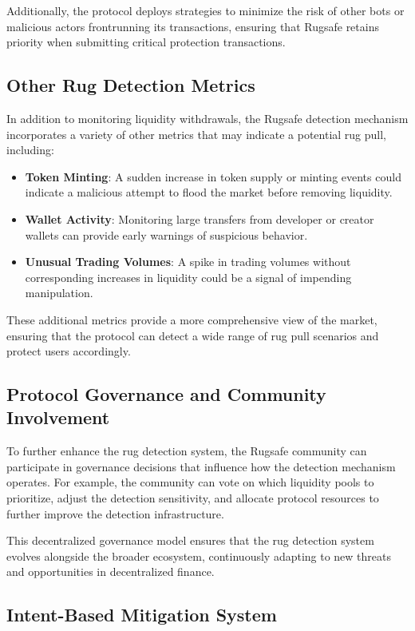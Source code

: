 \documentclass{article}
\begin{document}
Additionally, the protocol deploys strategies to minimize the risk of other bots or malicious actors frontrunning its transactions, ensuring that Rugsafe retains priority when submitting critical protection transactions.

\subsection{Other Rug Detection Metrics}

In addition to monitoring liquidity withdrawals, the Rugsafe detection mechanism incorporates a variety of other metrics that may indicate a potential rug pull, including:

\begin{itemize}
    \item \textbf{Token Minting}: A sudden increase in token supply or minting events could indicate a malicious attempt to flood the market before removing liquidity.
    \item \textbf{Wallet Activity}: Monitoring large transfers from developer or creator wallets can provide early warnings of suspicious behavior.
    \item \textbf{Unusual Trading Volumes}: A spike in trading volumes without corresponding increases in liquidity could be a signal of impending manipulation.
\end{itemize}

These additional metrics provide a more comprehensive view of the market, ensuring that the protocol can detect a wide range of rug pull scenarios and protect users accordingly.

\subsection{Protocol Governance and Community Involvement}

To further enhance the rug detection system, the Rugsafe community can participate in governance decisions that influence how the detection mechanism operates. For example, the community can vote on which liquidity pools to prioritize, adjust the detection sensitivity, and allocate protocol resources to further improve the detection infrastructure.

This decentralized governance model ensures that the rug detection system evolves alongside the broader ecosystem, continuously adapting to new threats and opportunities in decentralized finance.

\subsection{Intent-Based Mitigation System}
\end{document}
